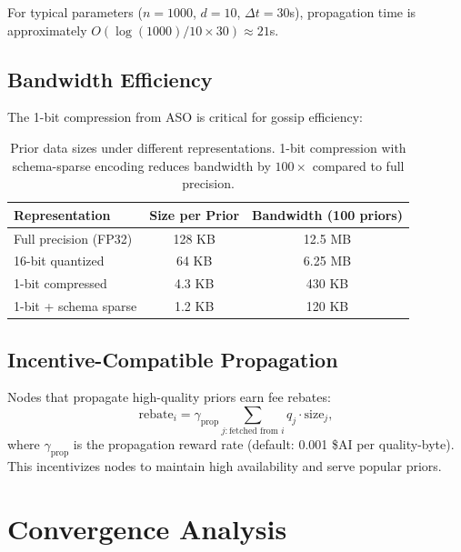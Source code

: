 \documentclass[11pt]{article}
\begin{document}
For typical parameters ($n = 1000$, $d = 10$, $\Delta t = 30$s), propagation
time is approximately $O(\log(1000) / 10 \times 30) \approx 21$s.

\subsection{Bandwidth Efficiency}

The 1-bit compression from ASO is critical for gossip efficiency:

\begin{table}[h]
\centering
\begin{tabular}{lcc}
\toprule
Representation & Size per Prior & Bandwidth (100 priors) \\
\midrule
Full precision (FP32) & 128 KB & 12.5 MB \\
16-bit quantized & 64 KB & 6.25 MB \\
1-bit compressed & 4.3 KB & 430 KB \\
1-bit + schema sparse & 1.2 KB & 120 KB \\
\bottomrule
\end{tabular}
\caption{Prior data sizes under different representations. 1-bit compression
with schema-sparse encoding reduces bandwidth by $100\times$ compared to
full precision.}
\label{tab:bandwidth}
\end{table}

\subsection{Incentive-Compatible Propagation}

Nodes that propagate high-quality priors earn fee rebates:
\begin{equation}
    \text{rebate}_i = \gamma_{\text{prop}} \sum_{j: \text{fetched from } i} q_j \cdot \text{size}_j,
    \label{eq:rebate}
\end{equation}
where $\gamma_{\text{prop}}$ is the propagation reward rate (default: 0.001 \$AI
per quality-byte). This incentivizes nodes to maintain high availability and
serve popular priors.

\section{Convergence Analysis}
\label{sec:convergence}
\end{document}
